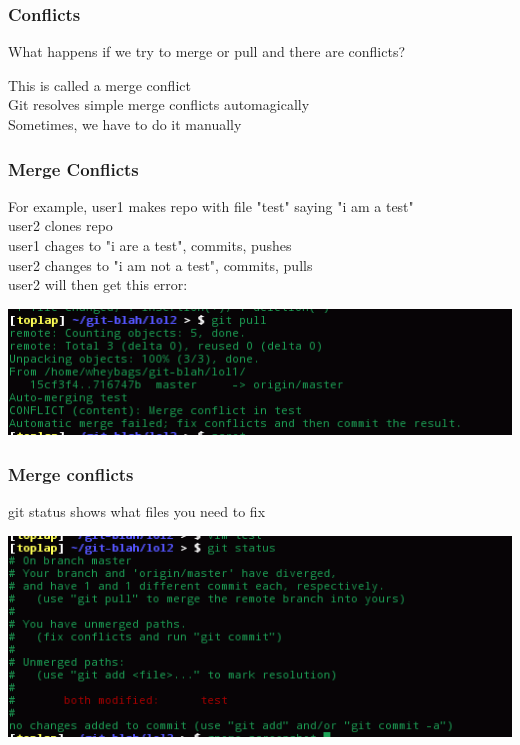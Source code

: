 \documentclass[xcolor=dvipsnames]{beamer}
\begin{document}
\begin{frame}
    \frametitle{Conflicts}

    What happens if we try to merge or pull and there are conflicts?\\\vbox{}
    
    This is called a merge conflict\\
    Git resolves simple merge conflicts automagically\\
    Sometimes, we have to do it manually\\
\end{frame}

\begin{frame}
    \frametitle{Merge Conflicts}

    For example, user1 makes repo with file "test" saying "i am a test"\\
    user2 clones repo\\
    user1 chages to "i are a test", commits, pushes\\
    user2 changes to "i am not a test", commits, pulls\\

    user2 will then get this error:
    \begin{center}
        \includegraphics[scale=0.4]{mergeconflict1.png}
    \end{center}
\end{frame}

\begin{frame}
    \frametitle{Merge conflicts}

    git status shows what files you need to fix

    \begin{center}
        \includegraphics[scale=0.4]{mergeconflict2.png}
    \end{center}
\end{frame}
 
\end{document}
